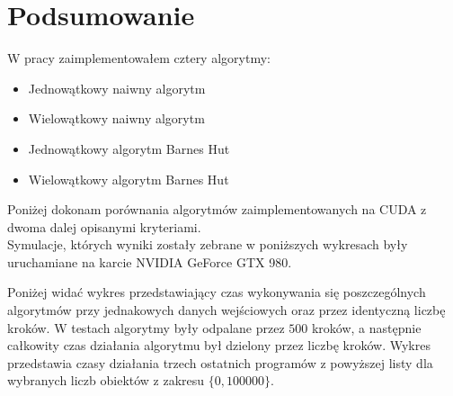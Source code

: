 \documentclass[14pt,twoside,a4paper]{article}
\theoremstyle{definition}
\begin{document}
\newpage

\section{\LARGE Podsumowanie}

W pracy zaimplementowałem cztery algorytmy:
\begin{itemize}
\item Jednowątkowy naiwny algorytm 
\item Wielowątkowy naiwny algorytm 
\item Jednowątkowy algorytm Barnes Hut
\item Wielowątkowy algorytm Barnes Hut
\end{itemize}

Poniżej dokonam porównania algorytmów zaimplementowanych na CUDA z dwoma dalej opisanymi kryteriami. \\
Symulacje, których wyniki zostały zebrane w poniższych wykresach były uruchamiane na karcie NVIDIA GeForce GTX 980.

Poniżej widać wykres przedstawiający czas wykonywania się poszczególnych algorytmów przy jednakowych danych wejściowych oraz przez identyczną liczbę kroków. W testach algorytmy były odpalane przez $500$ kroków, a następnie całkowity czas działania algorytmu był dzielony przez liczbę kroków. Wykres przedstawia czasy działania trzech ostatnich programów z powyższej listy dla wybranych liczb obiektów z zakresu $\{0,100000\}$.
\end{document}
